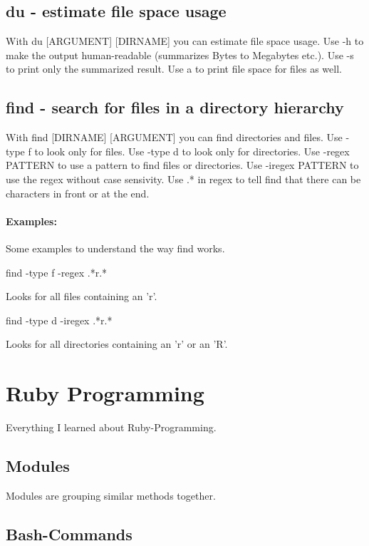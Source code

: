 \documentclass[10pt,a4paper]{scrartcl}
\begin{document}
\subsection{du - estimate file space usage}
With du [ARGUMENT] [DIRNAME] you can estimate file space usage. Use -h to make the output human-readable (summarizes Bytes to Megabytes etc.). Use -s to print only the summarized result. Use a to print file space for files as well. 

\subsection{find - search for files in a directory hierarchy}
With find [DIRNAME] [ARGUMENT] you can find directories and files. Use -type f to look only for files. Use -type d to look only for directories. Use -regex PATTERN to use a pattern to find files or directories. Use -iregex PATTERN to use the regex without case sensivity. Use .* in regex to tell find that there can be characters in front or at the end. 

\paragraph{Examples:} Some examples to understand the way find works.
\begin{terminalcode}
find -type f -regex .*r.*
\end{terminalcode}
Looks for all files containing an 'r'.

\begin{terminalcode}
find -type d -iregex .*r.*
\end{terminalcode}
Looks for all directories containing an 'r' or an 'R'.
\section{Ruby Programming}

Everything I learned about Ruby-Programming.

\subsection{Modules}

Modules are grouping similar methods together.

\subsection{Bash-Commands}
\end{document}

